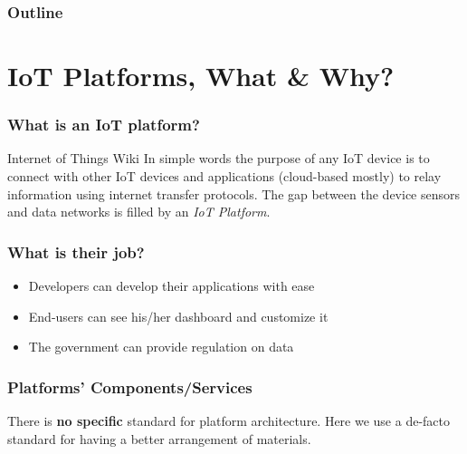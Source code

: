 \documentclass{../iot-lecture}
\subtitle{IoT Platforms}
\begin{document}
\begin{frame}
  \titlepage{}
\end{frame}
\begin{frame}
  \frametitle{Outline}
  \tableofcontents{}
\end{frame}

\section{IoT Platforms, What \& Why?}

\begin{frame}
  \frametitle{What is an IoT platform?}
  \begin{block}{Internet of Things Wiki}
    In simple words the purpose of any IoT device is to connect with
    other IoT devices and applications (cloud-based mostly) to relay
    information using internet transfer protocols.
    The gap between the device sensors and data networks is filled
    by an \textit{\color{Green} IoT Platform}.
  \end{block}
\end{frame}

\begin{frame}
  \frametitle{What is their job?}
  \begin{itemize}
    \item Developers can develop their applications with ease
    \item End-users can see his/her dashboard and customize it
    \item The government can provide regulation on data
  \end{itemize}
\end{frame}

\begin{frame}
  \frametitle{Platforms' Components/Services}
  \begin{block}{}
    There is \textbf{no specific} standard for platform architecture.
    Here we use a de-facto standard for having a better arrangement of materials.
  \end{block}
\end{frame}
\end{document}
